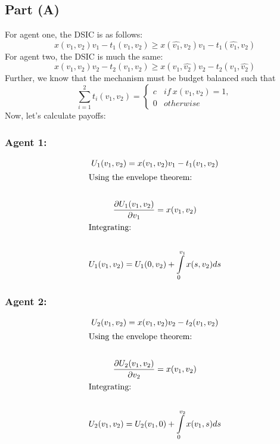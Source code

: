 \documentclass[10pt,a4paper]{article}
\begin{document}
  \subsection*{Part (A)}
    For agent one, the DSIC is as follows:
    \begin{equation}
      x(v_1,v_2)v_1 - t_1(v_1,v_2) \geq x(\hat{v_1},v_2)v_1 - t_1(\hat{v_1},v_2)
    \end{equation}
    For agent two, the DSIC is much the same:
    \begin{equation}
      x(v_1,v_2)v_2 - t_2(v_1,v_2) \geq x(v_1,\hat{v_2})v_2 - t_2(v_1,\hat{v_2})
    \end{equation}
    Further, we know that the mechanism must be budget balanced such that 
    \begin{equation}
      \sum\limits_{i=1}^2 t_i(v_1,v_2) = \begin{cases}
        c & if \ x(v_1,v_2) = 1, \\
        0 & otherwise
      \end{cases}
    \end{equation}
    Now, let's calculate payoffs:
    \subsubsection*{Agent 1:}
      \begin{gather*}
        U_1(v_1,v_2) = x(v_1,v_2)v_1 - t_1(v_1,v_2) \\
        \shortintertext{Using the envelope theorem:} \\
        \frac{\partial U_1(v_1,v_2)}{\partial v_1} = x(v_1,v_2) \\
        \shortintertext{Integrating:} \\
        U_1(v_1,v_2) = U_1(0,v_2) + \int\limits_0^{v_1}x(s,v_2)ds
      \end{gather*}
    \subsubsection*{Agent 2:}
      \begin{gather*}
        U_2(v_1,v_2) = x(v_1,v_2)v_2 - t_2(v_1,v_2) \\
        \shortintertext{Using the envelope theorem:} \\
        \frac{\partial U_2(v_1,v_2)}{\partial v_2} = x(v_1,v_2) \\
        \shortintertext{Integrating:} \\
        U_2(v_1,v_2) = U_2(v_1,0) + \int\limits_0^{v_2}x(v_1,s)ds
      \end{gather*}
\end{document}
